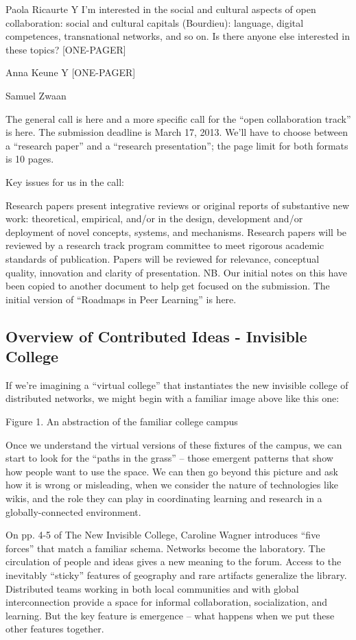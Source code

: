 \documentclass[twoside]{article}
\begin{document}
\begin{multicols}{2}
    Paola Ricaurte Y I'm interested in the social and cultural aspects of open collaboration: social and cultural capitals (Bourdieu): language, digital competences, transnational networks, and so on. Is there anyone else interested in these topics? [ONE-PAGER]

    Anna Keune Y [ONE-PAGER]

    Samuel Zwaan 


The general call is here and a more specific call for the ``open collaboration track'' is here. The submission deadline is March 17, 2013. We'll have to choose between a ``research paper'' and a ``research presentation''; the page limit for both formats is 10 pages.

Key issues for us in the call:

Research papers present integrative reviews or original reports of substantive new work: theoretical, empirical, and/or in the design, development and/or deployment of novel concepts, systems, and mechanisms. Research papers will be reviewed by a research track program committee to meet rigorous academic standards of publication. Papers will be reviewed for relevance, conceptual quality, innovation and clarity of presentation.
NB. Our initial notes on this have been copied to another document to help get focused on the submission. The initial version of ``Roadmaps in Peer Learning'' is here.

\subsection{Overview of Contributed Ideas - Invisible College}

If we're imagining a ``virtual college'' that instantiates the new invisible college of distributed networks, we might begin with a familiar image above like this one:

Figure 1. An abstraction of the familiar college campus

Once we understand the virtual versions of these fixtures of the campus, we can start to look for the ``paths in the grass'' -- those emergent patterns that show how people want to use the space. We can then go beyond this picture and ask how it is wrong or misleading, when we consider the nature of technologies like wikis, and the role they can play in coordinating learning and research in a globally-connected environment.

On pp. 4-5 of The New Invisible College, Caroline Wagner introduces ``five forces'' that match a familiar schema. Networks become the laboratory. The circulation of people and ideas gives a new meaning to the forum. Access to the inevitably ``sticky'' features of geography and rare artifacts generalize the library. Distributed teams working in both local communities and with global interconnection provide a space for informal collaboration, socialization, and learning. But the key feature is emergence -- what happens when we put these other features together.


\end{multicols}
\end{document}
